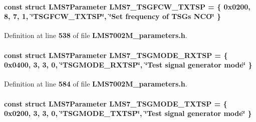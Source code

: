 \paragraph[{L\+M\+S7\+\_\+\+T\+S\+G\+F\+C\+W\+\_\+\+T\+X\+T\+SP}]{\setlength{\rightskip}{0pt plus 5cm}const struct {\bf L\+M\+S7\+Parameter} L\+M\+S7\+\_\+\+T\+S\+G\+F\+C\+W\+\_\+\+T\+X\+T\+SP = \{ 0x0200, 8, 7, 1, \char`\"{}\+T\+S\+G\+F\+C\+W\+\_\+\+T\+X\+T\+S\+P\char`\"{}, \char`\"{}\+Set frequency of T\+S\+G\textquotesingle{}s N\+C\+O\char`\"{} \}\hspace{0.3cm}{\ttfamily [static]}}\label{LMS7002M__parameters_8h_a1258deea17b58caa04449782309b0daa}


Definition at line {\bf 538} of file {\bf L\+M\+S7002\+M\+\_\+parameters.\+h}.

\paragraph[{L\+M\+S7\+\_\+\+T\+S\+G\+M\+O\+D\+E\+\_\+\+R\+X\+T\+SP}]{\setlength{\rightskip}{0pt plus 5cm}const struct {\bf L\+M\+S7\+Parameter} L\+M\+S7\+\_\+\+T\+S\+G\+M\+O\+D\+E\+\_\+\+R\+X\+T\+SP = \{ 0x0400, 3, 3, 0, \char`\"{}\+T\+S\+G\+M\+O\+D\+E\+\_\+\+R\+X\+T\+S\+P\char`\"{}, \char`\"{}\+Test signal generator mode\char`\"{} \}\hspace{0.3cm}{\ttfamily [static]}}\label{LMS7002M__parameters_8h_a26f5b9f564bccc13336e8b83ef75fd67}


Definition at line {\bf 584} of file {\bf L\+M\+S7002\+M\+\_\+parameters.\+h}.

\paragraph[{L\+M\+S7\+\_\+\+T\+S\+G\+M\+O\+D\+E\+\_\+\+T\+X\+T\+SP}]{\setlength{\rightskip}{0pt plus 5cm}const struct {\bf L\+M\+S7\+Parameter} L\+M\+S7\+\_\+\+T\+S\+G\+M\+O\+D\+E\+\_\+\+T\+X\+T\+SP = \{ 0x0200, 3, 3, 0, \char`\"{}\+T\+S\+G\+M\+O\+D\+E\+\_\+\+T\+X\+T\+S\+P\char`\"{}, \char`\"{}\+Test signal generator mode\char`\"{} \}\hspace{0.3cm}{\ttfamily [static]}}\label{LMS7002M__parameters_8h_a4c10b2f1ce51c94bc9a78dd6866e9952}


